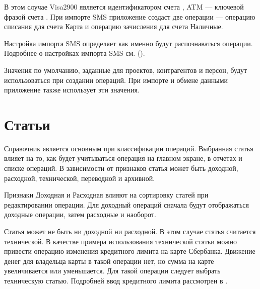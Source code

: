 \documentclass[a4paper,10pt,russian]{sphinxmanual}
\begin{document}
В этом случае Visa2900 является идентификатором счета , ATM — ключевой фразой счета . При импорте SMS приложение создаст
две операции — операцию списания для счета Карта и операцию зачисления для счета Наличные.

Настройка импорта SMS определяет как именно будут распознаваться операции.
Подробнее о настройках импорта SMS см. {\hyperref[\detokenize{notifications:chapter-notifications}]{}} ().

Значения по умолчанию, заданные для проектов, контрагентов и персон, будут использоваться при создании операций. При
импорте и обмене данными приложение также использует эти значения.

\noindent{}

\noindent{}

\noindent{}


\section{Статьи}
\label{\detokenize{directories:id5}}
Справочник  является основным при классификации операций. Выбранная статья влияет на то, как будет учитываться
операция на главном экране, в отчетах и списке операций. В зависимости от признаков статья может быть доходной, расходной,
технической, переводной и архивной.

Признаки Доходная и Расходная влияют на сортировку статей при редактировании операции. Для доходный операций сначала
будут отображаться доходные операции, затем расходные и наоборот.

Статья может не быть ни доходной ни расходной. В этом случае статья считается технической. В качестве примера использования
технической статьи можно привести операцию изменения кредитного лимита на карте Сбербанка.
Движение денег для владельца карты в такой операции нет, но сумма на карте увеличивается или уменьшается.
Для такой операции следует выбрать техническую статью. Подробней  ввод кредитного лимита
рассмотрен в .
\end{document}
